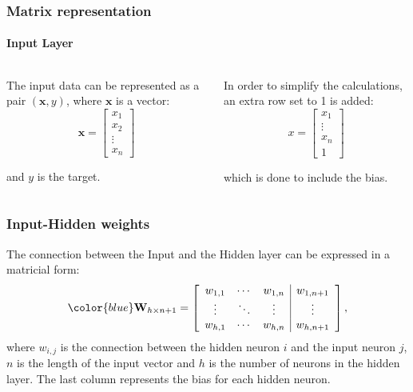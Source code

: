\begin{frame}
\frametitle{Matrix representation}
\framesubtitle{Input Layer}

\begin{columns}
\begin{column}{.48\textwidth}
The input data can be represented as a pair $(\mathbf{x},y)$, where $\mathbf{x}$ is a vector:
\[
        \mathbf{x}=\begin{bmatrix}
        x_1 \\ x_2 \\ \vdots \\ x_n
        \end{bmatrix}
\]


and $y$ is the target.

\end{column}

\begin{column}{.48\textwidth}
In order to simplify the calculations, an extra row set to 1 is added:
\[
        x=\begin{bmatrix}
        x_1  \\ \vdots \\ x_n \\ 1
        \end{bmatrix}
\]

which is done to include the bias.

\end{column}
\end{columns}
\end{frame}


\begin{frame}
\frametitle{Input-Hidden weights}

The connection between the Input and the Hidden layer can be expressed
in a matricial form:
\[
    {\color{blue}
    \mathbf{W}_{h \times {n+1}}} =
    \left[
      \begin{array}{ccc|c}
        w_{1, 1} & \cdots & w_{1, n} & w_{1, n+1} \\
        \vdots   & \ddots & \vdots   & \vdots     \\
        w_{h, 1} & \cdots & w_{h, n} & w_{h, n+1}
      \end{array}
    \right],
  \]
where $w_{i,j}$ is the connection between the hidden neuron $i$ and
the input neuron $j$, $n$ is the length of the input vector and $h$ is
the number of neurons in the hidden layer.
The last column represents the bias for each hidden neuron. 

\end{frame}

